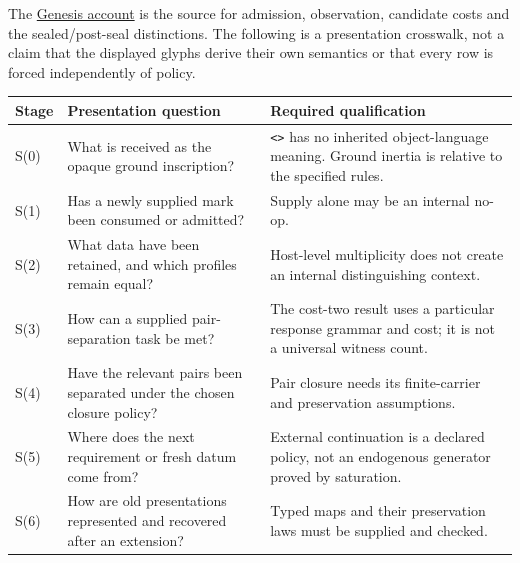 \documentclass[
  11pt,
]{article}
\begin{document}
The \href{docs/sources/genesis_education.txt}{Genesis account} is the
source for admission, observation, candidate costs and the
sealed/post-seal distinctions. The following is a presentation
crosswalk, not a claim that the displayed glyphs derive their own
semantics or that every row is forced independently of policy.

\begin{longtable}[]{@{}
  >{\raggedright\arraybackslash}p{}
  >{\raggedright\arraybackslash}p{}
  >{\raggedright\arraybackslash}p{}@{}}
\toprule\noalign{}
\begin{minipage}[b]{\linewidth}\raggedright
Stage
\end{minipage} & \begin{minipage}[b]{\linewidth}\raggedright
Presentation question
\end{minipage} & \begin{minipage}[b]{\linewidth}\raggedright
Required qualification
\end{minipage} \\
\midrule\noalign{}
\endhead
\bottomrule\noalign{}
\endlastfoot
S(0) & What is received as the opaque ground inscription? &
\texttt{\textless{}\textgreater{}} has no inherited object-language
meaning. Ground inertia is relative to the specified rules. \\
S(1) & Has a newly supplied mark been consumed or admitted? & Supply
alone may be an internal no-op. \\
S(2) & What data have been retained, and which profiles remain equal? &
Host-level multiplicity does not create an internal distinguishing
context. \\
S(3) & How can a supplied pair-separation task be met? & The cost-two
result uses a particular response grammar and cost; it is not a
universal witness count. \\
S(4) & Have the relevant pairs been separated under the chosen closure
policy? & Pair closure needs its finite-carrier and preservation
assumptions. \\
S(5) & Where does the next requirement or fresh datum come from? &
External continuation is a declared policy, not an endogenous generator
proved by saturation. \\
S(6) & How are old presentations represented and recovered after an
extension? & Typed maps and their preservation laws must be supplied and
checked. \\
\end{longtable}
\end{document}
